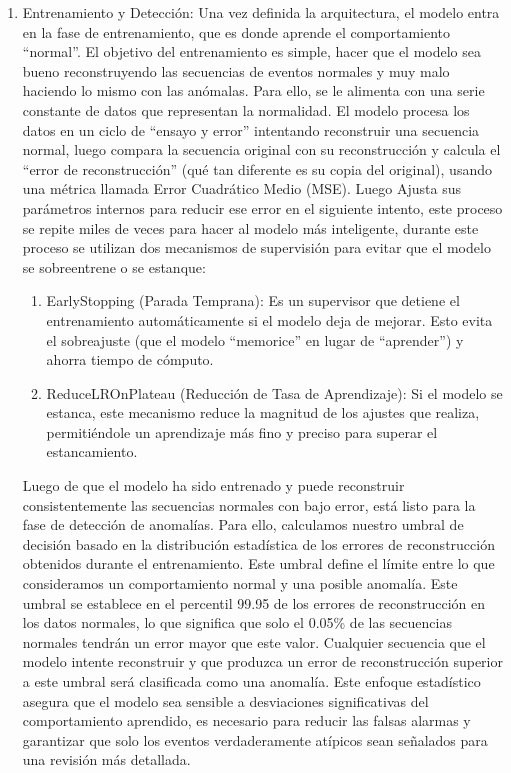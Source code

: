 \begin{enumerate}
\begin{enumerate}
                  \item Entrenamiento y Detección:
                        Una vez definida la arquitectura, el modelo entra en la fase de entrenamiento, que es donde aprende el comportamiento ``normal''. El objetivo del entrenamiento es simple, hacer que el modelo sea bueno reconstruyendo las secuencias de eventos normales y muy malo haciendo lo mismo con las anómalas. Para ello, se le alimenta con una serie constante de datos que representan la normalidad.
                        El modelo procesa los datos en un ciclo de ``ensayo y error'' intentando reconstruir una secuencia normal, luego compara la secuencia original con su reconstrucción y calcula el ``error de reconstrucción'' (qué tan diferente es su copia del original), usando una métrica llamada Error Cuadrático Medio (MSE). Luego Ajusta sus parámetros internos para reducir ese error en el siguiente intento, este proceso se repite miles de veces para hacer al modelo más inteligente, durante este proceso se utilizan dos mecanismos de supervisión para evitar que el modelo se sobreentrene o se estanque:
                        \begin{enumerate}
                              \item EarlyStopping (Parada Temprana): Es un supervisor que detiene el entrenamiento automáticamente si el modelo deja de mejorar. Esto evita el sobreajuste (que el modelo ``memorice'' en lugar de ``aprender'') y ahorra tiempo de cómputo.

                              \item ReduceLROnPlateau (Reducción de Tasa de Aprendizaje): Si el modelo se estanca, este mecanismo reduce la magnitud de los ajustes que realiza, permitiéndole un aprendizaje más fino y preciso para superar el estancamiento.
                        \end{enumerate}

                        Luego de que el modelo ha sido entrenado y puede reconstruir consistentemente las secuencias normales con bajo error, está listo para la fase de detección de anomalías. Para ello, calculamos nuestro umbral de decisión basado en la distribución estadística de los errores de reconstrucción obtenidos durante el entrenamiento. Este umbral define el límite entre lo que consideramos un comportamiento normal y una posible anomalía. Este umbral se establece en el percentil 99.95 de los errores de reconstrucción en los datos normales, lo que significa que solo el 0.05\% de las secuencias normales tendrán un error mayor que este valor.
                        Cualquier secuencia que el modelo intente reconstruir y que produzca un error de reconstrucción superior a este umbral será clasificada como una anomalía. Este enfoque estadístico asegura que el modelo sea sensible a desviaciones significativas del comportamiento aprendido, es necesario para reducir las falsas alarmas y garantizar que solo los eventos verdaderamente atípicos sean señalados para una revisión más detallada.
            \end{enumerate}
\end{enumerate}



